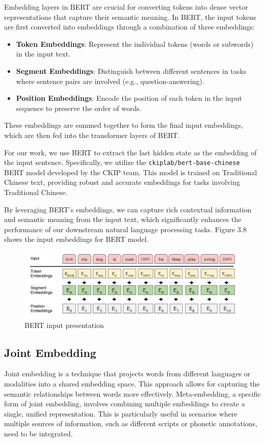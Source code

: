 \documentclass[PhD]{PHlab-thesis}
\begin{document}
Embedding layers in BERT are crucial for converting tokens into dense vector representations that capture their semantic meaning. In BERT, the input tokens are first converted into embeddings through a combination of three embeddings:

\begin{itemize}
    \item \textbf{Token Embeddings}: Represent the individual tokens (words or subwords) in the input text.
    \item \textbf{Segment Embeddings}: Distinguish between different sentences in tasks where sentence pairs are involved (e.g., question-answering).
    \item \textbf{Position Embeddings}: Encode the position of each token in the input sequence to preserve the order of words.
\end{itemize}

These embeddings are summed together to form the final input embeddings, which are then fed into the transformer layers of BERT.

For our work, we use BERT to extract the last hidden state as the embedding of the input sentence. Specifically, we utilize the \texttt{ckiplab/bert-base-chinese} BERT model developed by the CKIP team. This model is trained on Traditional Chinese text, providing robust and accurate embeddings for tasks involving Traditional Chinese.

By leveraging BERT's embeddings, we can capture rich contextual information and semantic meaning from the input text, which significantly enhances the performance of our downstream natural language processing tasks.
Figure 3.8 shows the input embeddings for BERT model.

\begin{figure}[h!]
  \centering
  \includegraphics[width=\linewidth]{fig_3_bert_presentation.jpg}
  \captionsetup{type=figure}
  \caption{BERT input presentation}
  \label{fig:bert_presentation}
\end{figure}


\subsection{Joint Embedding}
Joint embedding is a technique that projects words from different languages or modalities into a shared embedding space. This approach allows for capturing the semantic relationships between words more effectively. Meta-embedding\cite{kiela-etal-2018-dynamic}, a specific form of joint embedding, involves combining multiple embeddings to create a single, unified representation. This is particularly useful in scenarios where multiple sources of information, such as different scripts or phonetic annotations, need to be integrated.
\end{document}
